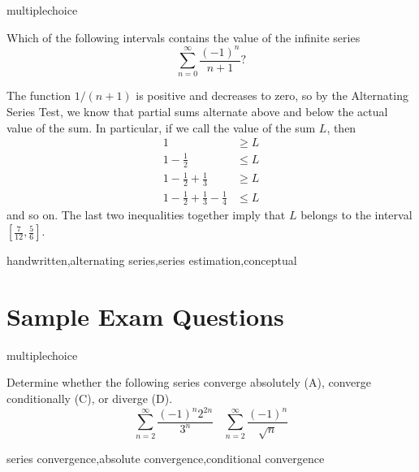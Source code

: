 \documentclass{ximera}
\begin{document}
\begin{question}[2019AltSerError]
\begin{type}
multiplechoice
\end{type}
Which of the following intervals contains the value of the infinite series
\[ \sum_{n=0}^\infty \frac{(-1)^n}{n+1}? \]
\begin{multiplechoice}
\end{multiplechoice}
\begin{feedback}
The function \(1/(n+1)\) is positive and decreases to zero, so by the Alternating Series Test, we know that partial sums alternate above and below the actual value of the sum.  In particular, if we call the value of the sum \(L\), then
\[
\begin{aligned}
1 & \geq  L \\
1 - \frac{1}{2} & \leq  L \\
1 - \frac{1}{2} + \frac{1}{3} & \geq L \\
1 - \frac{1}{2} + \frac{1}{3} - \frac{1}{4} & \leq L
\end{aligned}
\]
and so on. The last two inequalities together imply that \(L\) belongs to the interval \([\frac{7}{12},\frac{5}{6}]\).
\end{feedback}
\begin{keywords}
handwritten,alternating series,series estimation,conceptual
\end{keywords}
\end{question}

\section*{Sample Exam Questions}

\begin{question}[2017C.12]
\begin{type}
multiplechoice
\end{type}
Determine whether the following series converge absolutely (A), converge conditionally (C), or diverge (D). 
\[ \sum_{n=2}^\infty \frac{(-1)^n 2^{2n}}{3^n} \ \ \ \ \sum_{n=2}^\infty \frac{(-1)^n}{\sqrt{n}} \]
\begin{multiplechoice}
 \choicebreak
{}
\end{multiplechoice}
\begin{keywords}
series convergence,absolute convergence,conditional convergence
\end{keywords}
\end{question}
\end{document}

